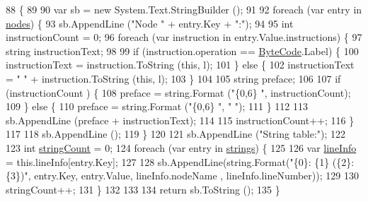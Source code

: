 \begin{DoxyCode}
88                                           \{
89 
90             var sb = \textcolor{keyword}{new} System.Text.StringBuilder ();
91 
92             \textcolor{keywordflow}{foreach} (var entry \textcolor{keywordflow}{in} \hyperlink{a00124_a3f4928a577c88263ad016be259b175c4}{nodes}) \{
93                 sb.AppendLine (\textcolor{stringliteral}{"Node "} + entry.Key + \textcolor{stringliteral}{":"});
94 
95                 \textcolor{keywordtype}{int} instructionCount = 0;
96                 \textcolor{keywordflow}{foreach} (var instruction \textcolor{keywordflow}{in} entry.Value.instructions) \{
97                     \textcolor{keywordtype}{string} instructionText;
98 
99                     \textcolor{keywordflow}{if} (instruction.operation == \hyperlink{a00029_ad5dfb6ee68ca7469623ad3e459f98894}{ByteCode}.Label) \{
100                         instructionText = instruction.ToString (\textcolor{keyword}{this}, l);
101                     \} \textcolor{keywordflow}{else} \{
102                         instructionText = \textcolor{stringliteral}{"    "} + instruction.ToString (\textcolor{keyword}{this}, l);
103                     \}
104 
105                     \textcolor{keywordtype}{string} preface;
106 
107                     \textcolor{keywordflow}{if} (instructionCount %
      ) \{
108                         preface = string.Format (\textcolor{stringliteral}{"\{0,6\}   "}, instructionCount);
109                     \} \textcolor{keywordflow}{else} \{
110                         preface = string.Format (\textcolor{stringliteral}{"\{0,6\}   "}, \textcolor{stringliteral}{" "});
111                     \}
112 
113                     sb.AppendLine (preface + instructionText);
114 
115                     instructionCount++;
116                 \}
117 
118                 sb.AppendLine ();
119             \}
120 
121             sb.AppendLine (\textcolor{stringliteral}{"String table:"});
122 
123             \textcolor{keywordtype}{int} \hyperlink{a00124_a8ef1d10094ef00311aade6715ba78ec7}{stringCount} = 0;
124             \textcolor{keywordflow}{foreach} (var entry \textcolor{keywordflow}{in} \hyperlink{a00124_a91518fda7e41bf573f66c6946dd3b4cb}{strings}) \{
125 
126                 var \hyperlink{a00124_a0d4da395947767b4a1eaaff8a9842adc}{lineInfo} = this.lineInfo[entry.Key];
127 
128                 sb.AppendLine(string.Format(\textcolor{stringliteral}{"\{0\}: \{1\} (\{2\}:\{3\})"}, entry.Key, entry.Value, lineInfo.nodeName
      , lineInfo.lineNumber));
129 
130                 stringCount++;
131             \}
132 
133 
134             \textcolor{keywordflow}{return} sb.ToString ();
135         \}
\end{DoxyCode}
